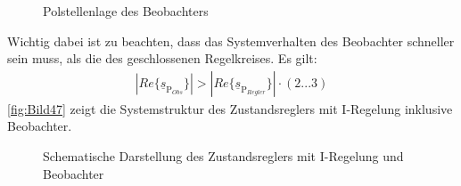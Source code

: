 \begin{figure}[H]
    \centering
    \caption[Polstellen des Beobachters]{Polstellenlage des Beobachters}
    \label{fig:Bild46}
\end{figure}

Wichtig dabei ist zu beachten, dass das Systemverhalten des Beobachter schneller sein muss, als die des geschlossenen Regelkreises. Es gilt:
\begin{align}
    \left| Re\{ \underline{s}_{\mathrm{P}_{Obs}}\}\right| > \left| Re\{ \underline{s}_{\mathrm{P}_{Regler}}\}\right| \cdot (2 ... 3)
\end{align}
\newline
\autoref{fig:Bild47} zeigt die Systemstruktur des Zustandsreglers mit I-Regelung inklusive Beobachter.

\begin{figure}[H]
    \centering
    \caption[Reglerstruktur mit Beobachter]{Schematische Darstellung des Zustandsreglers mit I-Regelung und Beobachter}
    \label{fig:Bild47}
\end{figure}


